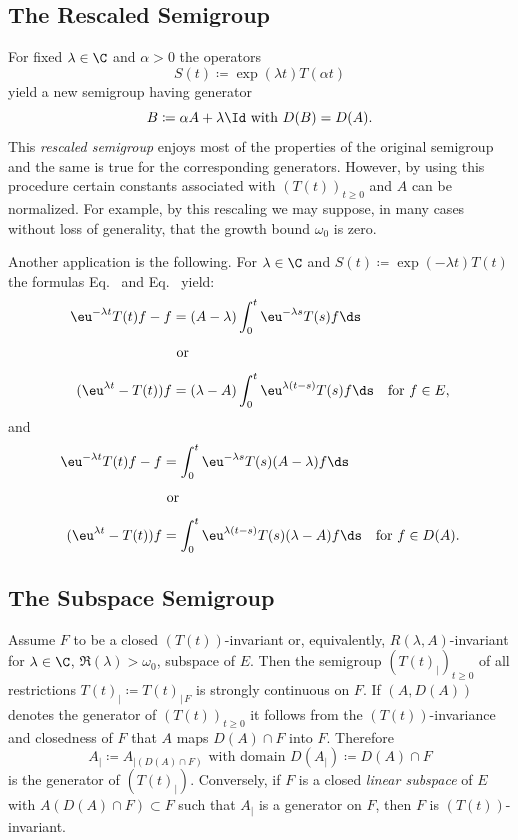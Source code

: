 \subsection{The Rescaled Semigroup}\label{subsec:a1-3.2}%
For fixed $\lambda \in \C$ and $\alpha > 0$ the operators
\[
    S(t) \coloneqq \exp(\lambda t)T(\alpha t)
\]
yield a new semigroup having generator
\[
    B \coloneqq \alpha A + \lambda \Id \text{ with } D(B) = D(A) .
\]
This \emph{rescaled semigroup} enjoys most of the properties of the original semigroup and the same is true for the corresponding generators.
However, by using this procedure certain constants associated with $(T(t))_{t \geq 0}$ and $A$ can be normalized.
For example, by this rescaling we may suppose, in many cases without loss of generality, that the growth bound $\omega_{0}$ is zero.

Another application is the following.
For $\lambda \in \C$ and $S(t) \coloneqq \exp(-\lambda t)T(t)$ the formulas Eq.~ and Eq.~ yield:
\begin{equation}\label{eq:a1-3.1}
\begin{split}
     \eu^{-\lambda t}T(t)f - f &= (A-\lambda) \int_{0}^{t}  \eu^{-\lambda s}T(s)f \ds \\[4pt]
     & \text{ or } \\[4pt]
    ( \eu^{\lambda t}-T(t))f &= (\lambda-A) \int_{0}^{t}  \eu^{\lambda(t-s)}T(s)f \ds \quad \text{for } f \in E,  
\end{split}
\end{equation}
and
\begin{equation}\label{eq:a1-3.2}
\begin{split}
     \eu^{-\lambda t}T(t)f - f &= \int_{0}^{t}  \eu^{-\lambda s}T(s)(A-\lambda)f \ds \\[4pt]
     & \text{ or } \\[4pt]
    ( \eu^{\lambda t} - T(t))f &= \int_{0}^{t}  \eu^{\lambda(t-s)}T(s)(\lambda-A)f \ds \quad \text{for } f \in D(A).  
\end{split}
\end{equation}
\subsection{The Subspace Semigroup}\label{subsec:a1-3.3}%
Assume $F$ to be a closed $(T(t))$-invariant or, equivalently, $R(\lambda,A)$-invariant for 
$\lambda \in \C$, 
$ \Re(\lambda) > \omega_{0}$, subspace of\/ $E$.
Then the semigroup $(T(t)_{|})_{t \geq 0}$ of all restrictions $T(t)_{|} \coloneqq T(t)_{|\,F}$ is strongly continuous on $F$.
If\/ $(A,D(A))$ denotes the generator of\/ $(T(t))_{t \geq 0}$ it follows from the $(T(t))$-invariance and closedness of\/ $F$ that $A$ maps $D(A) \cap F$ into $F$.
Therefore
\[
    A_{|} \coloneqq A_{| (D(A)\cap F)} \text{ with domain } D(A_{|}) \coloneqq D(A) \cap F
\]
is the generator of\/ $(T(t)_{|})$.
%
Conversely, if\/ $F$ is a closed \emph{linear subspace} of\/ $E$ with $A(D(A) \cap F) \subset F$ such that 
$A_{|}$ is a generator on $F$, then $F$ is $(T(t))$-invariant.

